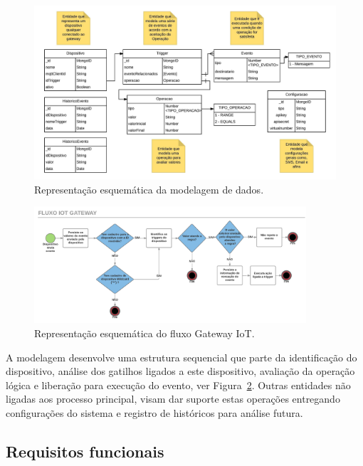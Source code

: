 \begin{figure}[h!]
	\begin{center}
		\includegraphics[width=1.085\textwidth]{./img/modelo-de-dados}
		\caption{Representação esquemática da modelagem de dados.}
		\label{fig:modeloDeDados}
	\end{center}
\end{figure}

\begin{figure}[h!]
		\begin{center}
		\includegraphics[width=0.9\textwidth]{./img/fluxograma}
		\caption{Representação esquemática do fluxo Gateway IoT.}
		\label{fig:fluxograma}
	\end{center}
\end{figure}

A modelagem desenvolve uma estrutura sequencial que parte da identificação do dispositivo, análise dos gatilhos ligados a este dispositivo, avaliação da operação lógica e liberação para execução do evento, ver Figura~\ref{fig:fluxograma}. Outras entidades não ligadas aos processo principal, visam dar suporte estas operações entregando configurações do sistema e registro de históricos para análise futura. 

\subsection{Requisitos funcionais}
\label{reqFuncionais}

